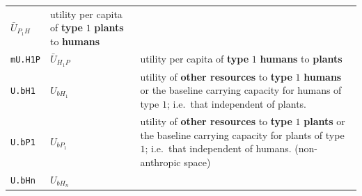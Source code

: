 \documentclass[
]{book}
\begin{document}
\begin{longtable}[]{@{}lll@{}}
\begin{minipage}[t]{0.25\columnwidth}
\(\bar{U}_{P_{1}H}\)\strut
\end{minipage} & \begin{minipage}[t]{0.40\columnwidth}\raggedright
utility per capita of \textbf{type} \(1\) \textbf{plants} to \textbf{humans}\strut
\end{minipage}\tabularnewline
\begin{minipage}[t]{0.27\columnwidth}\raggedright
\texttt{mU.H1P}\strut
\end{minipage} & \begin{minipage}[t]{0.25\columnwidth}\raggedright
\(\bar{U}_{H_{1}P}\)\strut
\end{minipage} & \begin{minipage}[t]{0.40\columnwidth}\raggedright
utility per capita of \textbf{type} \(1\) \textbf{humans} to \textbf{plants}\strut
\end{minipage}\tabularnewline
\begin{minipage}[t]{0.27\columnwidth}\raggedright
\texttt{U.bH1}\strut
\end{minipage} & \begin{minipage}[t]{0.25\columnwidth}\raggedright
\(U_{bH_{1}}\)\strut
\end{minipage} & \begin{minipage}[t]{0.40\columnwidth}\raggedright
utility of \textbf{other resources} to \textbf{type} \(1\) \textbf{humans} or the baseline carrying capacity for humans of type \(1\); i.e.~that independent of plants.\strut
\end{minipage}\tabularnewline
\begin{minipage}[t]{0.27\columnwidth}\raggedright
\texttt{U.bP1}\strut
\end{minipage} & \begin{minipage}[t]{0.25\columnwidth}\raggedright
\(U_{bP_{1}}\)\strut
\end{minipage} & \begin{minipage}[t]{0.40\columnwidth}\raggedright
utility of \textbf{other resources} to \textbf{type} \(1\) \textbf{plants} or the baseline carrying capacity for plants of type \(1\); i.e.~that independent of humans. (non-anthropic space)\strut
\end{minipage}\tabularnewline
\begin{minipage}[t]{0.27\columnwidth}\raggedright
\texttt{U.bHn}\strut
\end{minipage} & \begin{minipage}[t]{0.25\columnwidth}\raggedright
\(U_{bH_{n}}\)\strut
\end{minipage} & \begin{minipage}[t]{0.40\columnwidth}\raggedright

\end{minipage}
\end{longtable}
\end{document}
